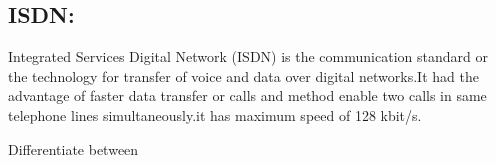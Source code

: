 \documentclass[a4paper,12pt]{article}
\begin{document}
\subsection{ISDN:}
\begin{A}
{
Integrated Services Digital Network (ISDN) is the communication standard or the technology for transfer of voice and data over digital networks.It had the advantage of faster data transfer or calls and method enable two calls in same telephone lines simultaneously.it has maximum speed of 128 kbit/s. }

\end{A}


\begin{Q}
{Differentiate between}
\end{Q}

\end{document}
